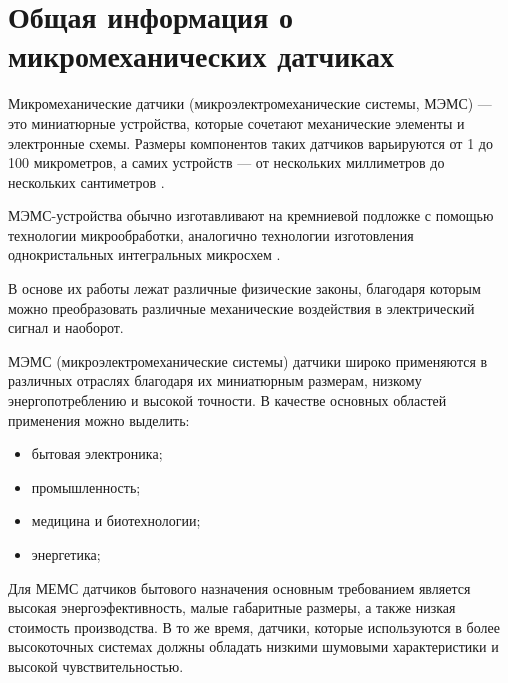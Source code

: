 \section{Общая информация о микромеханических датчиках}
\label{sec:general_info_nt}

Микромеханические датчики (микроэлектромеханические системы, МЭМС) — это миниатюрные устройства, которые сочетают механические элементы и электронные схемы. Размеры компонентов таких датчиков варьируются от 1 до 100 микрометров, а самих устройств — от нескольких миллиметров до нескольких сантиметров \cite{adams_layton_2010}.


МЭМС-устройства обычно изготавливают на кремниевой подложке с помощью технологии микрообработки, аналогично технологии изготовления однокристальных интегральных микросхем \cite{adams_layton_2010}.

В основе их работы лежат различные физические законы, благодаря которым можно преобразовать различные механические воздействия в электрический сигнал и наоборот.


МЭМС (микроэлектромеханические системы) датчики широко применяются в различных отраслях благодаря их миниатюрным размерам, низкому энергопотреблению и высокой точности. В качестве основных областей применения можно выделить:

\begin{itemize}
	\item бытовая электроника;
	\item промышленность;
	\item медицина и биотехнологии;
	\item энергетика;
\end{itemize}

Для МЕМС датчиков бытового назначения основным требованием является высокая энергоэфективность, малые габаритные размеры, а также низкая стоимость производства. В то же время, датчики, которые используются в более высокоточных системах должны обладать низкими шумовыми характеристики и высокой чувствительностью.
